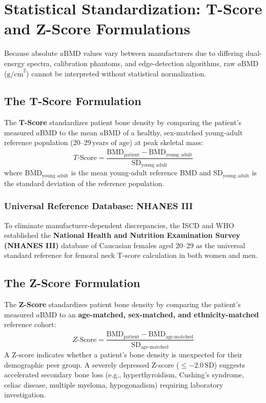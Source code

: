 \documentclass[11pt,a4paper]{article}
\begin{document}
\newpage
\section{Statistical Standardization: T-Score and Z-Score Formulations}

Because absolute $a\text{BMD}$ values vary between manufacturers due to differing dual-energy spectra, calibration phantoms, and edge-detection algorithms, raw $a\text{BMD}$ ($\text{g/cm}^2$) cannot be interpreted without statistical normalization.

\subsection{The T-Score Formulation}

The \textbf{T-Score} standardizes patient bone density by comparing the patient's measured $a\text{BMD}$ to the mean $a\text{BMD}$ of a healthy, sex-matched young-adult reference population ($20\text{--}29\,\text{years of age}$) at peak skeletal mass:
\begin{equation}
    T\text{-Score} = \frac{\text{BMD}_{\text{patient}} - \overline{\text{BMD}}_{\text{young adult}}}{\text{SD}_{\text{young adult}}}
\end{equation}
where $\overline{\text{BMD}}_{\text{young adult}}$ is the mean young-adult reference BMD and $\text{SD}_{\text{young adult}}$ is the standard deviation of the reference population.

\subsubsection{Universal Reference Database: NHANES III}
To eliminate manufacturer-dependent discrepancies, the ISCD and WHO established the \textbf{National Health and Nutrition Examination Survey (NHANES III)} database of Caucasian females aged 20--29 as the universal standard reference for femoral neck T-score calculation in both women and men.

\subsection{The Z-Score Formulation}

The \textbf{Z-Score} standardizes patient bone density by comparing the patient's measured $a\text{BMD}$ to an \textbf{age-matched, sex-matched, and ethnicity-matched} reference cohort:
\begin{equation}
    Z\text{-Score} = \frac{\text{BMD}_{\text{patient}} - \overline{\text{BMD}}_{\text{age-matched}}}{\text{SD}_{\text{age-matched}}}
\end{equation}
A Z-score indicates whether a patient's bone density is unexpected for their demographic peer group. A severely depressed Z-score ($\le -2.0\,\text{SD}$) suggests accelerated secondary bone loss (e.g., hyperthyroidism, Cushing's syndrome, celiac disease, multiple myeloma, hypogonadism) requiring laboratory investigation.
\end{document}
